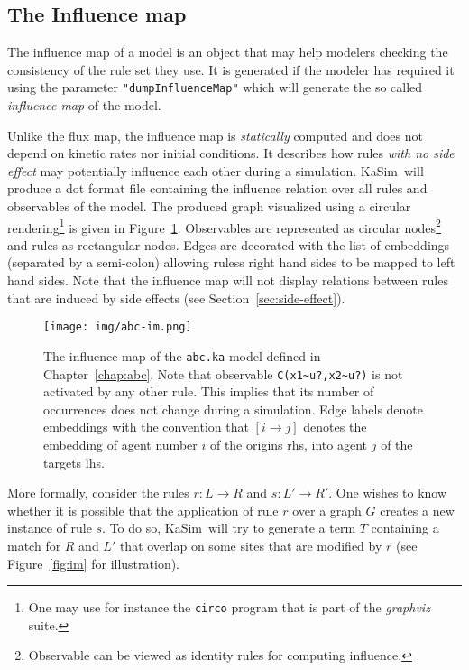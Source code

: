 \documentclass[11pt]{book}
\def\KaSim{\textsf{KaSim}}
\def\int{\hbox{\texttt{\~}}}
\def\ttt#1{\texttt{#1}}
\def\rar{\rightarrow}
\begin{document}
\subsection{The Influence map}
The influence map of a model is an object that may help modelers checking the consistency of the rule set they use. It is generated if the modeler has required it using the parameter \ttt{"dumpInfluenceMap"} which will generate the so called \emph{influence map} of the model.

Unlike the flux map, the influence map is \emph{statically} computed and does not depend on kinetic rates nor initial conditions. It describes how rules \emph{with no side effect} may potentially influence each other during a simulation. \KaSim~will produce a dot format file containing the influence relation over all rules and observables of the model. The produced graph visualized using a circular rendering\footnote{One may use for instance the \ttt{circo} program that is part of the \textit{graphviz} suite.} is given in Figure~\ref{fig:abc-im}. Observables are represented as circular nodes\footnote{Observable can be viewed as identity rules for computing influence.} and rules as rectangular nodes. Edges are decorated with the list of embeddings (separated by a semi-colon) allowing rules\textquotesingle s right hand sides to be mapped to left hand sides. Note that the influence map will not display relations between rules that are induced by side effects (see Section~\ref{sec:side-effect}).

\begin{figure}[htbp] %
   \centering
   \texttt{[image: img/abc-im.png]} 
   \caption{The influence map of the \ttt{abc.ka} model defined in Chapter~\ref{chap:abc}. Note that observable \ttt{C(x1\int u?,x2\int u?)} is not activated by any other rule. This implies that its number of occurrences does not change during a simulation. Edge labels denote embeddings with the convention that $[i\rar j]$ denotes the embedding of agent number $i$ of the origin\textquotesingle s rhs, into agent $j$ of the target\textquotesingle s lhs.}
   \label{fig:abc-im}
\end{figure}

More formally, consider the rules $r:L\rar R$ and $s:L'\rar R'$. One wishes to know whether it is possible that the application of rule $r$ over a graph $G$ creates a new instance of rule $s$. To do so, \KaSim~will try to generate a term $T$ containing a match for $R$ and $L'$ that overlap on some sites that are modified by $r$ (see Figure~\ref{fig:im} for illustration).
\end{document}
